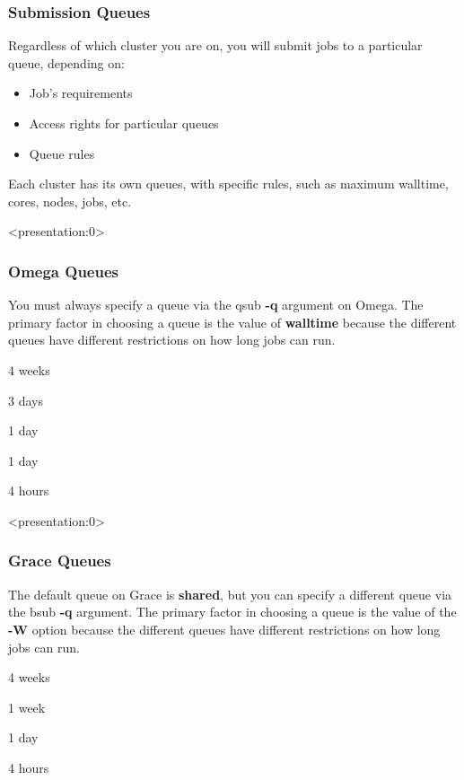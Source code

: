 \documentclass[10pt]{beamer}
\begin{document}
\begin{frame}[fragile]
\frametitle{Submission Queues}

Regardless of which cluster you are on, you will submit jobs to a particular queue, depending on:
\begin{itemize}
\item{Job's requirements}
\item{Access rights for particular queues}
\item{Queue rules}
\end{itemize}

Each cluster has its own queues, with specific rules, such as maximum walltime, cores, nodes, jobs, etc.  
\vspace{0.1in}


\end{frame}

\begin{frame}<presentation:0>
\frametitle{Omega Queues}
You must always specify a queue via the qsub \textbf{-q} argument on
Omega.  The primary factor in choosing a queue is the value of
\textbf{walltime} because the different queues have different
restrictions on how long jobs can run.

\vskip10pt
\begin{description}
\item[fas\_very\_long]       4 weeks
\item[fas\_long]             3 days
\item[fas\_high]             1 day
\item[fas\_normal]           1 day
\item[fas\_devel]            4 hours
\end{description}

\end{frame}

\begin{frame}<presentation:0>
\frametitle{Grace Queues}
The default queue on Grace is \textbf{shared}, but you can specify
a different queue via the bsub \textbf{-q} argument.
The primary factor in choosing a queue is the value of the \textbf{-W}
option because the different queues have different restrictions on how
long jobs can run.

\vskip10pt
\begin{description}[interactive]
\item[long]                  4 weeks
\item[week]                  1 week
\item[shared]                1 day
\item[interactive]           4 hours
\end{description}

\end{frame}
\end{document}
